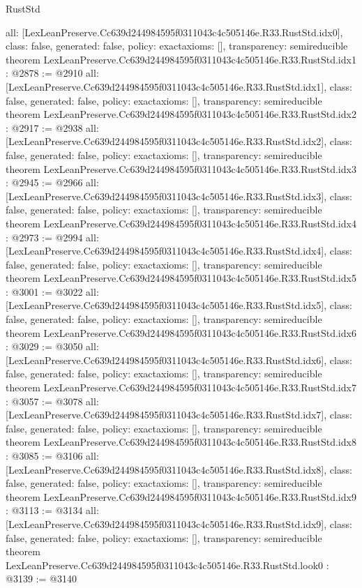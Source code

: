\begin{lexlean}{RustStd}
\begin{coremodule}
{  all: [LexLeanPreserve.Cc639d244984595f0311043c4c505146e.R33.RustStd.idx0],
  class: false,
  generated: false,
  policy: exact{axioms: []},
  transparency: semireducible
}
theorem LexLeanPreserve.Cc639d244984595f0311043c4c505146e.R33.RustStd.idx1 : @2878 := @2910 {
  all: [LexLeanPreserve.Cc639d244984595f0311043c4c505146e.R33.RustStd.idx1],
  class: false,
  generated: false,
  policy: exact{axioms: []},
  transparency: semireducible
}
theorem LexLeanPreserve.Cc639d244984595f0311043c4c505146e.R33.RustStd.idx2 : @2917 := @2938 {
  all: [LexLeanPreserve.Cc639d244984595f0311043c4c505146e.R33.RustStd.idx2],
  class: false,
  generated: false,
  policy: exact{axioms: []},
  transparency: semireducible
}
theorem LexLeanPreserve.Cc639d244984595f0311043c4c505146e.R33.RustStd.idx3 : @2945 := @2966 {
  all: [LexLeanPreserve.Cc639d244984595f0311043c4c505146e.R33.RustStd.idx3],
  class: false,
  generated: false,
  policy: exact{axioms: []},
  transparency: semireducible
}
theorem LexLeanPreserve.Cc639d244984595f0311043c4c505146e.R33.RustStd.idx4 : @2973 := @2994 {
  all: [LexLeanPreserve.Cc639d244984595f0311043c4c505146e.R33.RustStd.idx4],
  class: false,
  generated: false,
  policy: exact{axioms: []},
  transparency: semireducible
}
theorem LexLeanPreserve.Cc639d244984595f0311043c4c505146e.R33.RustStd.idx5 : @3001 := @3022 {
  all: [LexLeanPreserve.Cc639d244984595f0311043c4c505146e.R33.RustStd.idx5],
  class: false,
  generated: false,
  policy: exact{axioms: []},
  transparency: semireducible
}
theorem LexLeanPreserve.Cc639d244984595f0311043c4c505146e.R33.RustStd.idx6 : @3029 := @3050 {
  all: [LexLeanPreserve.Cc639d244984595f0311043c4c505146e.R33.RustStd.idx6],
  class: false,
  generated: false,
  policy: exact{axioms: []},
  transparency: semireducible
}
theorem LexLeanPreserve.Cc639d244984595f0311043c4c505146e.R33.RustStd.idx7 : @3057 := @3078 {
  all: [LexLeanPreserve.Cc639d244984595f0311043c4c505146e.R33.RustStd.idx7],
  class: false,
  generated: false,
  policy: exact{axioms: []},
  transparency: semireducible
}
theorem LexLeanPreserve.Cc639d244984595f0311043c4c505146e.R33.RustStd.idx8 : @3085 := @3106 {
  all: [LexLeanPreserve.Cc639d244984595f0311043c4c505146e.R33.RustStd.idx8],
  class: false,
  generated: false,
  policy: exact{axioms: []},
  transparency: semireducible
}
theorem LexLeanPreserve.Cc639d244984595f0311043c4c505146e.R33.RustStd.idx9 : @3113 := @3134 {
  all: [LexLeanPreserve.Cc639d244984595f0311043c4c505146e.R33.RustStd.idx9],
  class: false,
  generated: false,
  policy: exact{axioms: []},
  transparency: semireducible
}
theorem LexLeanPreserve.Cc639d244984595f0311043c4c505146e.R33.RustStd.look0 : @3139 := @3140 {
}
\end{coremodule}
\end{lexlean}

